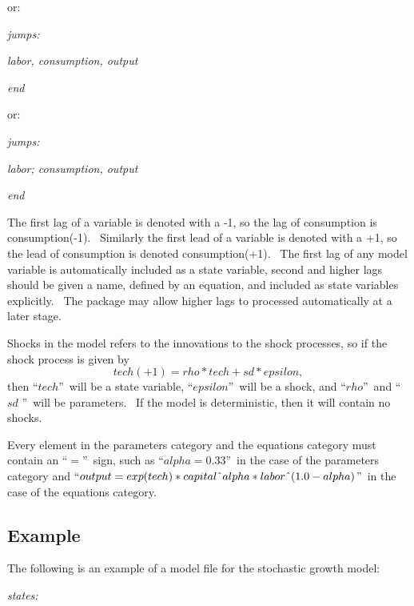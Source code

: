 \documentclass[notitlepage,11pt]{article}
\begin{document}
\bigskip

or:

\textit{jumps:}

\textit{labor, consumption, output}

\textit{end}

\bigskip

or:

\textit{jumps:}

\textit{labor; consumption, output}

\textit{end}

\bigskip

The first lag of a variable is denoted with a -1, so the lag of consumption
is consumption(-1). \ Similarly the first lead of a variable is denoted with
a +1, so the lead of consumption is denoted consumption(+1). \ The first lag
of any model variable is automatically included as a state variable, second
and higher lags should be given a name, defined by an equation, and included
as state variables explicitly. \ The package may allow higher lags to
processed automatically at a later stage.

Shocks in the model refers to the innovations to the shock processes, so if
the shock process is given by%
\begin{equation*}
tech(+1)=rho\ast tech+sd\ast epsilon,
\end{equation*}%
then \textquotedblleft $tech$\textquotedblright\ will be a state variable,
\textquotedblleft $epsilon$\textquotedblright\ will be a shock, and
\textquotedblleft $rho$\textquotedblright\ and \textquotedblleft $sd$%
\textquotedblright\ will be parameters. \ If the model is deterministic,
then it will contain no shocks.

Every element in the parameters category and the equations category must
contain an \textquotedblleft $=$\textquotedblright\ sign, such as
\textquotedblleft $alpha=0.33$\textquotedblright\ in the case of the
parameters category and \textquotedblleft $output=exp(tech)\ast capital%
\symbol{94}alpha\ast labor\symbol{94}(1.0-alpha)$\textquotedblright\ in the
case of the equations category.

\subsection{Example}

The following is an example of a model file for the stochastic growth model:

\bigskip

\textit{states:}
\end{document}
